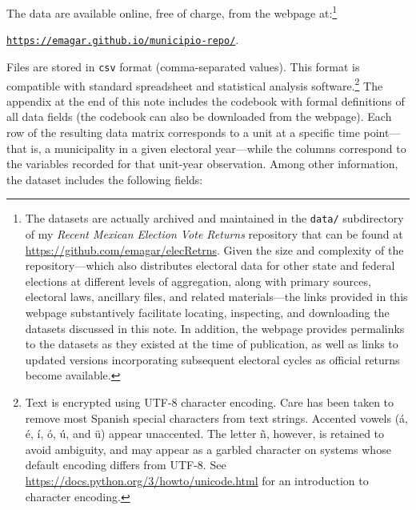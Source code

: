 \documentclass[letter,12pt]{article}
\begin{document}
The data are available online, free of charge, from the webpage at:\footnote{The datasets are actually archived and maintained in the \verb|data/| subdirectory of my \emph{Recent Mexican Election Vote Returns} repository that can be found at \url{https://github.com/emagar/elecRetrns}. Given the size and complexity of the repository---which also distributes electoral data for other state and federal elections at different levels of aggregation, along with primary sources, electoral laws, ancillary files, and related materials---the links provided in this webpage substantively facilitate locating, inspecting, and downloading the datasets discussed in this note. In addition, the webpage provides permalinks to the datasets as they existed at the time of publication, as well as links to updated versions incorporating subsequent electoral cycles as official returns become available.}

\begin{center}
\href{https://emagar.github.io/municipio-repo/}{\texttt{\url{https://emagar.github.io/municipio-repo/}}}.
\end{center}

\noindent Files are stored in \verb|csv| format (comma-separated values). This format is compatible with standard spreadsheet and statistical analysis software.\footnote{Text is encrypted using UTF-8 character encoding. Care has been taken to remove most Spanish special characters from text strings. Accented vowels (\'a, \'e, \'i, \'o, \'u, and \"u) appear unaccented. The letter \~n, however, is retained to avoid ambiguity, and may appear as a garbled character on systems whose default encoding differs from UTF-8. See \url{https://docs.python.org/3/howto/unicode.html} for an introduction to character encoding.} The appendix at the end of this note includes the codebook with formal definitions of all data fields (the codebook can also be downloaded from the webpage). Each row of the resulting data matrix corresponds to a unit at a specific time point---that is, a municipality in a given electoral year---while the columns correspond to the variables recorded for that unit-year observation. Among other information, the dataset includes the following fields:
\end{document}
